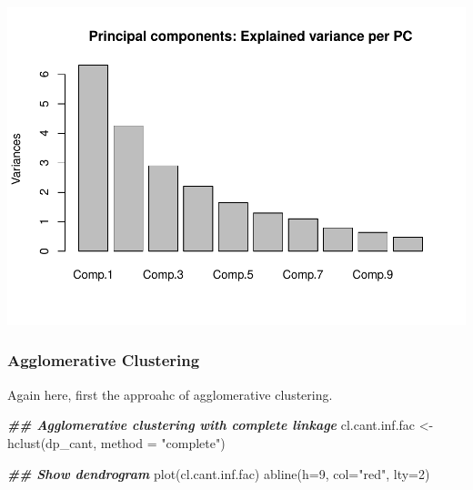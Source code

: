 \documentclass[
]{article}
\newenvironment{Shaded}{\begin{snugshade}}{\end{snugshade}}
\newcommand{\AttributeTok}[1]{\textcolor[rgb]{0.77,0.63,0.00}{#1}}
\newcommand{\CommentTok}[1]{\textcolor[rgb]{0.56,0.35,0.01}{\textit{#1}}}
\newcommand{\DecValTok}[1]{\textcolor[rgb]{0.00,0.00,0.81}{#1}}
\newcommand{\DocumentationTok}[1]{\textcolor[rgb]{0.56,0.35,0.01}{\textbf{\textit{#1}}}}
\newcommand{\FunctionTok}[1]{\textcolor[rgb]{0.00,0.00,0.00}{#1}}
\newcommand{\NormalTok}[1]{#1}
\newcommand{\OtherTok}[1]{\textcolor[rgb]{0.56,0.35,0.01}{#1}}
\newcommand{\SpecialCharTok}[1]{\textcolor[rgb]{0.00,0.00,0.00}{#1}}
\newcommand{\StringTok}[1]{\textcolor[rgb]{0.31,0.60,0.02}{#1}}
\begin{document}
\includegraphics{Influence_factors_files/figure-latex/3.17_ca_data_prep_cant-1.pdf}

\begin{Shaded}
\end{Shaded}

\hypertarget{agglomerative-clustering-1}{%
\subsubsection{Agglomerative
Clustering}\label{agglomerative-clustering-1}}

Again here, first the approahc of agglomerative clustering.

\begin{Shaded}
\begin{Highlighting}[]
\DocumentationTok{\#\# Agglomerative clustering with complete linkage}
\NormalTok{cl.cant.inf.fac }\OtherTok{\textless{}{-}} \FunctionTok{hclust}\NormalTok{(dp\_cant, }\AttributeTok{method =} \StringTok{"complete"}\NormalTok{)}

\DocumentationTok{\#\# Show dendrogram}
\FunctionTok{plot}\NormalTok{(cl.cant.inf.fac)}
\FunctionTok{abline}\NormalTok{(}\AttributeTok{h=}\DecValTok{9}\NormalTok{, }\AttributeTok{col=}\StringTok{"red"}\NormalTok{, }\AttributeTok{lty=}\DecValTok{2}\NormalTok{)}
\end{Highlighting}
\end{Shaded}
\end{document}
